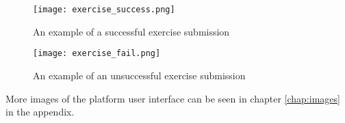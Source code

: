 \begin{figure}[H]
	\texttt{[image: exercise\_success.png]}
	\centering
	\caption{An example of a successful exercise submission}
	\label{fig:exercise_success}
\end{figure}

\begin{figure}[H]
	\texttt{[image: exercise\_fail.png]}
	\centering
	\caption{An example of an unsuccessful exercise submission}
	\label{fig:exercise_fail}
\end{figure}

More images of the platform user interface can be seen in chapter \ref{chap:images} in the appendix. 
